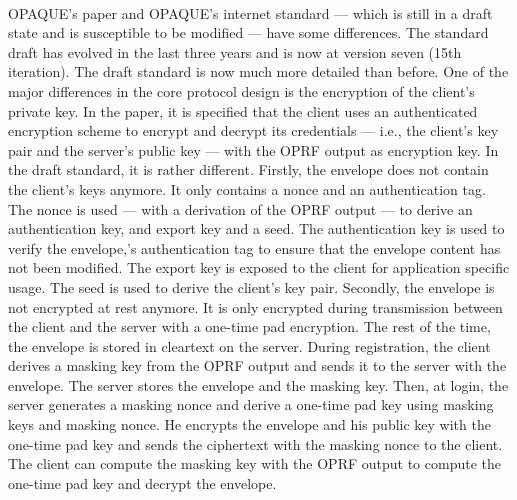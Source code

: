 ﻿\documentclass[../report.tex]{subfiles}
\begin{document}
\paragraph{}  \label{sec:opaque_paper_vs_draft}
OPAQUE's paper \cite{OPAQUE_Paper} and OPAQUE's internet standard \cite{OPAQUE_Standard_Draft} --- which is still in a draft state and is susceptible to be modified --- have some differences. The standard draft has evolved in the last three years and is now at version seven (15th iteration).
The draft standard is now much more detailed than before.
One of the major differences in the core protocol design is the encryption of the client's private key.
In the paper, it is specified that the client uses an authenticated encryption scheme to encrypt and decrypt its credentials --- i.e., the client's key pair and the server's public key --- with the OPRF output as encryption key.
%
In the draft standard, it is rather different.
Firstly, the envelope does not contain the client's keys anymore. It only contains a nonce and an authentication tag. 
The nonce is used --- with a derivation of the OPRF output --- to derive an authentication key, and export key and a seed.
The authentication key is used to verify the envelope,'s authentication tag to ensure that the envelope content has not been modified.
The export key is exposed to the client for application specific usage.
The seed is used to derive the client's key pair.
Secondly, the envelope is not encrypted at rest anymore. It is only encrypted during transmission between the client and the server with a one-time pad encryption. The rest of the time, the envelope is stored in cleartext on the server.
During registration, the client derives a masking key from the OPRF output and sends it to the server with the envelope. The server stores the envelope and the masking key.
Then, at login, the server generates a masking nonce and derive a one-time pad key using masking keys and masking nonce. He encrypts the envelope and his public key with the one-time pad key and sends the ciphertext with the masking nonce to the client.
The client can compute the masking key with the OPRF output to compute the one-time pad key and decrypt the envelope.




\subsection{}
\end{document}

